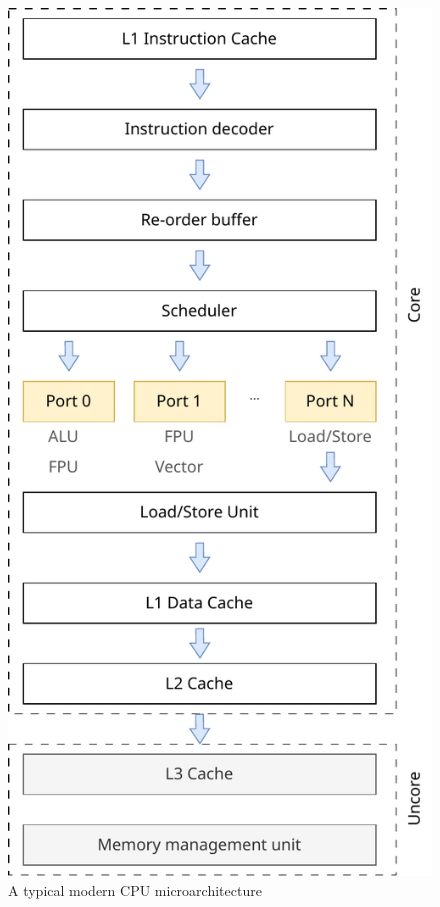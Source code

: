 \begin{figure}[h!]
  \includegraphics[scale=0.5]{cpu_uarch.pdf}
  \centering
  \caption{A typical modern CPU microarchitecture}
\end{figure}

